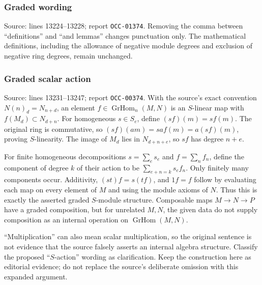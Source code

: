 \subsubsection{Graded wording}\label{graded-wording}

Source: lines 13224--13228; report \texttt{OCC-01374}. Removing the comma between ``definitions'' and ``and lemmas'' changes punctuation only. The mathematical definitions, including the allowance of negative module degrees and exclusion of negative ring degrees, remain unchanged.

\subsubsection{Graded scalar action}\label{graded-scalar-action}

Source: lines 13231--13247; report \texttt{OCC-00374}. With the source's exact convention \(N(n)_d=N_{n+d}\), an element \(f\in\operatorname{GrHom}_n(M,N)\) is an \(S\)-linear map with \(f(M_d)\subset N_{d+n}\). For homogeneous \(s\in S_e\), define \((sf)(m)=s f(m)\). The original ring is commutative, so \((sf)(am)=sa f(m)=a(sf)(m)\), proving \(S\)-linearity. The image of \(M_d\) lies in \(N_{d+n+e}\), so \(sf\) has degree \(n+e\).

For finite homogeneous decompositions \(s=\sum_e s_e\) and \(f=\sum_n f_n\), define the component of degree \(k\) of their action to be \(\sum_{e+n=k}s_ef_n\). Only finitely many components occur. Additivity, \((st)f=s(tf)\), and \(1f=f\) follow by evaluating each map on every element of \(M\) and using the module axioms of \(N\). Thus this is exactly the asserted graded \(S\)-module structure. Composable maps \(M\to N\to P\) have a graded composition, but for unrelated \(M,N\), the given data do not supply composition as an internal operation on \(\operatorname{GrHom}(M,N)\).

``Multiplication'' can also mean scalar multiplication, so the original sentence is not evidence that the source falsely asserts an internal algebra structure. Classify the proposed ``\(S\)-action'' wording as clarification. Keep the construction here as editorial evidence; do not replace the source's deliberate omission with this expanded argument.
